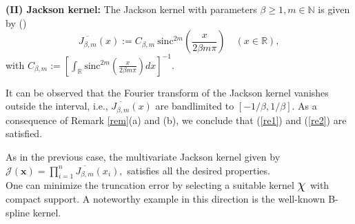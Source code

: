 \documentclass[11pt, a4paper]{article}
\theoremstyle{definition}
\numberwithin{equation}{section}
\def\RR{\mathbb R}
\def\Chi{\mbox{\Large$\chi$}}
\def\sinc{\text{sinc}}
\begin{document}
\textbf{(II)  Jackson kernel:}
The Jackson kernel with parameters  $\beta \geq 1,m \in \mathbb{N}$ is given by (\cite{bardaro10})
$$ \overline{J_{\beta,m}}(x):= C_{\beta,m}\ \sinc^{2m} \left(\frac{ x}{2 \beta m \pi} \right) \quad (x \in \RR),$$
with $\displaystyle C_{\beta,m} := \left[\int_{\RR} \sinc^{2m} \left(\frac{x}{2 \beta m \pi} \right){dx}\right]^{-1}$.
\par
It can be observed that the Fourier transform of the Jackson kernel vanishes outside the interval, i.e., $\overline{J_{\beta,m}}(x)$ are bandlimited to $[-{1}/{\beta},{1}/{\beta}]$.  As a consequence of Remark \ref{rem}(a) and (b), we conclude that (\ref{re1}) and (\ref{re2}) are satisfied. 
\par
 As in the previous case, the multivariate Jackson kernel given by 
 $\displaystyle \mathcal{J}(\textbf{x}) = \prod_{i=1}^{n} \overline{J_{\beta,m}}(x_i),$
 satisfies all the desired properties.\\

One can minimize the truncation error by selecting a suitable kernel $\Chi$ with compact support. A noteworthy example in this direction is the well-known B-spline kernel.
\end{document}
